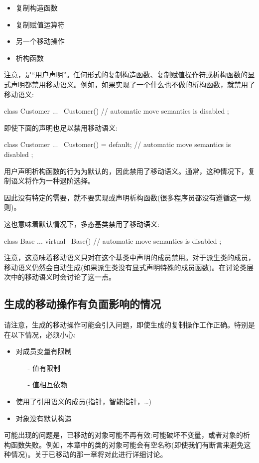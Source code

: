 \begin{itemize}
	\item 复制构造函数
	\item 复制赋值运算符
	\item 另一个移动操作
	\item 析构函数
\end{itemize}

注意，是“用户声明”。任何形式的复制构造函数、复制赋值操作符或析构函数的显式声明都禁用移动语义。例如，如果实现了一个什么也不做的析构函数，就禁用了移动语义:

\begin{cppcode}
class Customer {
	...
	~Customer() { // automatic move semantics is disabled
	}
};
\end{cppcode}

即使下面的声明也足以禁用移动语义:

\begin{cppcode}
class Customer {
	...
	~Customer() = default; // automatic move semantics is disabled
};
\end{cppcode}

用户声明析构函数的行为为默认的，因此禁用了移动语义。通常，这种情况下，复制语义将作为一种退阶选择。

因此没有特定的需要，就不要实现或声明析构函数(很多程序员都没有遵循这一规则)。

这也意味着默认情况下，多态基类禁用了移动语义:

\begin{cppcode}
class Base {
	...
	virtual ~Base() { // automatic move semantics is disabled
	}
};
\end{cppcode}

注意，这意味着移动语义只对在这个基类中声明的成员禁用。对于派生类的成员，移动语义仍然会自动生成(如果派生类没有显式声明特殊的成员函数)。在讨论类层次中的移动语义时会讨论了这一点。

\subsection{生成的移动操作有负面影响的情况}

请注意，生成的移动操作可能会引入问题，即使生成的复制操作工作正确。特别是在以下情况，必须小心:

\begin{itemize}
	\item 对成员变量有限制
	\begin{itemize}
		\item[-] 值有限制
		\item[-] 值相互依赖
	\end{itemize}
	\item 使用了引用语义的成员(指针，智能指针，…)
	\item 对象没有默认构造
\end{itemize}

可能出现的问题是，已移动的对象可能不再有效:可能破坏不变量，或者对象的析构函数失败。例如，本章中的类的对象可能会有空名称(即使我们有断言来避免这种情况)。关于已移动的那一章将对此进行详细讨论。











